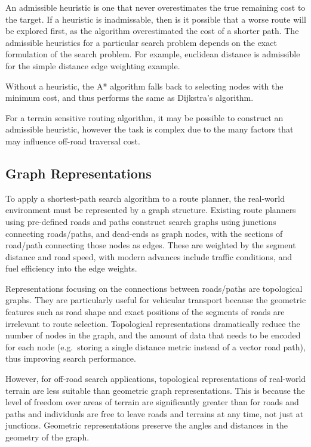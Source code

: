 \documentclass[12pt]{article}
\begin{document}
An admissible heuristic is one that never overestimates the true remaining cost to the target. If a heuristic is inadmissable, then is it possible that a worse route will be explored first, as the algorithm overestimated the cost of a shorter path. The admissible heuristics for a particular search problem depends on the exact formulation of the search problem. For example, euclidean distance is admissible for the simple distance edge weighting example.

Without a heuristic, the A* algorithm falls back to selecting nodes with the minimum cost, and thus performs the same as Dijkstra's algorithm.

For a terrain sensitive routing algorithm, it may be possible to construct an admissible heuristic, however the task is complex due to the many factors that may influence off-road traversal cost.

\subsection{Graph Representations}

To apply a shortest-path search algorithm to a route planner, the real-world environment must be represented by a graph structure. Existing route planners using pre-defined roads and paths construct search graphs using junctions connecting roads/paths, and dead-ends as graph nodes, with the sections of road/path connecting those nodes as edges. These are weighted by the segment distance and road speed, with modern advances include traffic conditions, and fuel efficiency into the edge weights.

Representations focusing on the connections between roads/paths are topological graphs. They are particularly useful for vehicular transport because the geometric features such as road shape and exact positions of the segments of roads are irrelevant to route selection. Topological representations dramatically reduce the number of nodes in the graph, and the amount of data that needs to be encoded for each node (e.g.\ storing a single distance metric instead of a vector road path), thus improving search performance.

However, for off-road search applications, topological representations of real-world terrain are less suitable than geometric graph representations. This is because the level of freedom over areas of terrain are significantly greater than for roads and paths and individuals are free to leave roads and terrains at any time, not just at junctions. Geometric representations preserve the angles and distances in the geometry of the graph.
\end{document}
